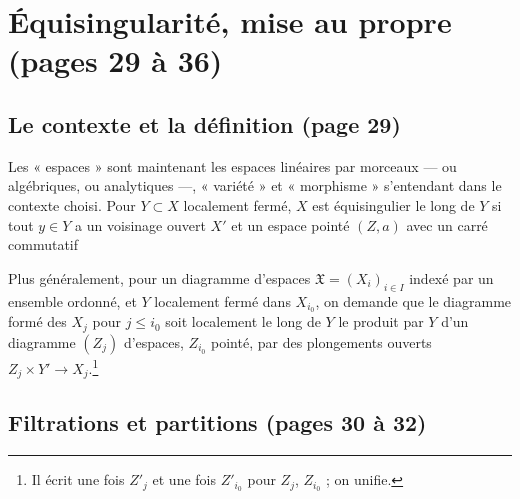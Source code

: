 \documentclass[11pt,a4paper]{article}
\begin{document}
\section*{Équisingularité, mise au propre (pages 29 à 36)}

\subsection*{Le contexte et la définition (page 29)}

Les « espaces » sont maintenant les espaces linéaires par morceaux — ou
algébriques, ou analytiques —, « variété » et « morphisme » s'entendant dans
le contexte choisi. Pour $Y \subset X$ localement fermé, $X$ est équisingulier
le long de $Y$ si tout $y \in Y$ a un voisinage ouvert $X'$ et un espace pointé
$(Z, a)$ avec un carré commutatif


Plus généralement, pour un diagramme d'espaces $\mathfrak{X} = (X_i)_{i \in I}$
indexé par un ensemble ordonné, et $Y$ localement fermé dans $X_{i_0}$, on
demande que le diagramme formé des $X_j$ pour $j \leqslant i_0$ soit localement
le long de $Y$ le produit par $Y$ d'un diagramme $(Z_j)$ d'espaces, $Z_{i_0}$
pointé, par des plongements ouverts $Z_j \times Y' \to X_j$.\footnote{Il écrit
une fois $Z'_j$ et une fois $Z'_{i_0}$ pour $Z_j$, $Z_{i_0}$ ; on unifie.}

\subsection*{Filtrations et partitions (pages 30 à 32)}
\end{document}
